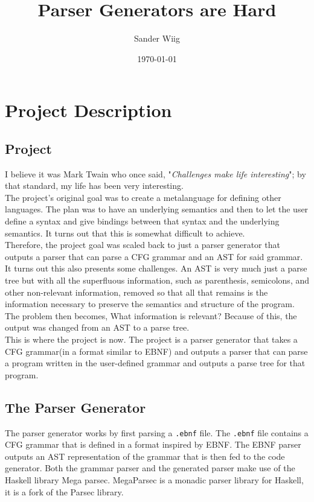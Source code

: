\documentclass{article}
\title{Parser Generators are Hard}
\author{Sander Wiig}
\date{\today}
\begin{document}
\maketitle


\section{Project Description}
\subsection{Project}
I believe it was Mark Twain who once said, "\textit{Challenges make life interesting}"; by that standard, my life has been very interesting.\\

The project's original goal was to create a metalanguage for defining other languages.
The plan was to have an underlying semantics and then to let the user define a syntax and give bindings between that syntax and the underlying semantics.
It turns out that this is somewhat difficult to achieve.\\
Therefore, the project goal was scaled back to just a parser generator that outputs a parser that can parse a CFG grammar and an AST for said grammar.\\

It turns out this also presents some challenges. 
An AST is very much just a parse tree but with all the superfluous information, such as parenthesis, semicolons, and other non-relevant information, removed so that all that remains is the information necessary to preserve the semantics and structure of the program. 
The problem then becomes, What information is relevant? 
Because of this, the output was changed from an AST to a parse tree.\\

This is where the project is now.
The project is a parser generator that takes a CFG grammar(in a format similar to EBNF) and outputs a parser that can parse a program written in the user-defined grammar and outputs a parse tree for that program.


\subsection{The Parser Generator}
The parser generator works by first parsing a \texttt{.ebnf} file. The \texttt{.ebnf} file contains a CFG grammar that is defined in a format inspired by EBNF.
The EBNF parser outputs an AST representation of the grammar that is then fed to the code generator. Both the grammar parser and the generated parser make use of the Haskell library Mega parsec.
MegaParsec is a monadic parser library for Haskell, it is a fork of the Parsec library\cite{megaparsec}.\\  
\end{document}
